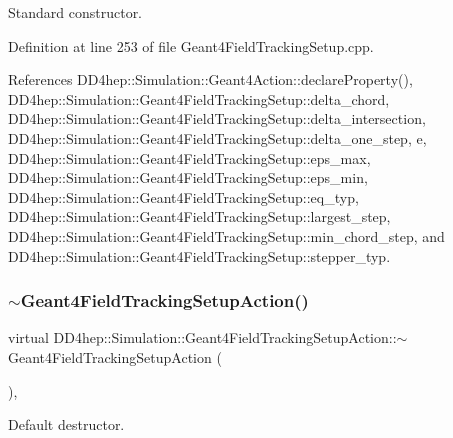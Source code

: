 Standard constructor. 



Definition at line 253 of file Geant4\+Field\+Tracking\+Setup.\+cpp.



References D\+D4hep\+::\+Simulation\+::\+Geant4\+Action\+::declare\+Property(), D\+D4hep\+::\+Simulation\+::\+Geant4\+Field\+Tracking\+Setup\+::delta\+\_\+chord, D\+D4hep\+::\+Simulation\+::\+Geant4\+Field\+Tracking\+Setup\+::delta\+\_\+intersection, D\+D4hep\+::\+Simulation\+::\+Geant4\+Field\+Tracking\+Setup\+::delta\+\_\+one\+\_\+step, e, D\+D4hep\+::\+Simulation\+::\+Geant4\+Field\+Tracking\+Setup\+::eps\+\_\+max, D\+D4hep\+::\+Simulation\+::\+Geant4\+Field\+Tracking\+Setup\+::eps\+\_\+min, D\+D4hep\+::\+Simulation\+::\+Geant4\+Field\+Tracking\+Setup\+::eq\+\_\+typ, D\+D4hep\+::\+Simulation\+::\+Geant4\+Field\+Tracking\+Setup\+::largest\+\_\+step, D\+D4hep\+::\+Simulation\+::\+Geant4\+Field\+Tracking\+Setup\+::min\+\_\+chord\+\_\+step, and D\+D4hep\+::\+Simulation\+::\+Geant4\+Field\+Tracking\+Setup\+::stepper\+\_\+typ.

\hypertarget{class_d_d4hep_1_1_simulation_1_1_geant4_field_tracking_setup_action_aec9b4efefc6cce22342b63fd91a5ef8b}{}\label{class_d_d4hep_1_1_simulation_1_1_geant4_field_tracking_setup_action_aec9b4efefc6cce22342b63fd91a5ef8b} 
\subsubsection{\texorpdfstring{$\sim$\+Geant4\+Field\+Tracking\+Setup\+Action()}{~Geant4FieldTrackingSetupAction()}}
{\footnotesize\ttfamily virtual D\+D4hep\+::\+Simulation\+::\+Geant4\+Field\+Tracking\+Setup\+Action\+::$\sim$\+Geant4\+Field\+Tracking\+Setup\+Action (\begin{DoxyParamCaption}{ }\end{DoxyParamCaption})\hspace{0.3cm}{\ttfamily [inline]}, {\ttfamily [virtual]}}



Default destructor. 



